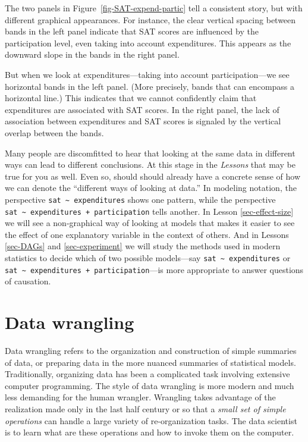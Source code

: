 \documentclass[
  letterpaper,
  DIV=11,
  numbers=noendperiod,
  oneside]{scrartcl}
\begin{document}
The two panels in Figure~\ref{fig-SAT-expend-partic} tell a consistent
story, but with different graphical appearances. For instance, the clear
vertical spacing between bands in the left panel indicate that SAT
scores are influenced by the participation level, even taking into
account expenditures. This appears as the downward slope in the bands in
the right panel.

But when we look at expenditures---taking into account
participation---we see horizontal bands in the left panel. (More
precisely, bands that can encompass a horizontal line.) This indicates
that we cannot confidently claim that expenditures are associated with
SAT scores. In the right panel, the lack of association between
expenditures and SAT scores is signaled by the vertical overlap between
the bands.

Many people are discomfitted to hear that looking at the same data in
different ways can lead to different conclusions. At this stage in the
\emph{Lessons} that may be true for you as well. Even so, should should
already have a concrete sense of how we can denote the ``different ways
of looking at data.'' In modeling notation, the perspective
\texttt{sat\ \textasciitilde{}\ expenditures} shows one pattern, while
the perspective
\texttt{sat\ \textasciitilde{}\ expenditures\ +\ participation} tells
another. In Lesson \ref{sec-effect-size} we will see a non-graphical way
of looking at models that makes it easier to see the effect of one
explanatory variable in the context of others. And in Lessons
\ref{sec-DAGs} and \ref{sec-experiment} we will study the methods used
in modern statistics to decide which of two possible models---say
\texttt{sat\ \textasciitilde{}\ expenditures} or
\texttt{sat\ \textasciitilde{}\ expenditures\ +\ participation}---is
more appropriate to answer questions of causation.

\newpage

\section{Data wrangling}\label{sec-wrangling}

Data wrangling refers to the organization and construction of simple
summaries of data, or preparing data in the more nuanced summaries of
statistical models. Traditionally, organizing data has been a
complicated task involving extensive computer programming. The style of
data wrangling is more modern and much less demanding for the human
wrangler. Wrangling takes advantage of the realization made only in the
last half century or so that a \emph{small set of simple operations} can
handle a large variety of re-organization tasks. The data scientist is
to learn what are these operations and how to invoke them on the
computer.
\end{document}
